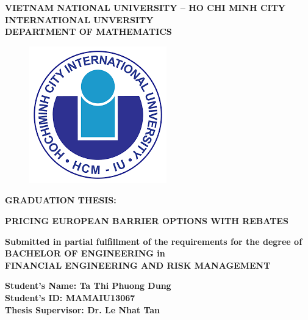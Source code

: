\documentclass[12pt,a4paper,left=2cm,right=2cm,oneside,titlepage]{report}
\numberwithin{equation}{section}
\begin{document}
\thispagestyle{empty}

\begin{center}
	\fontsize{12pt}{18pt}\selectfont \textbf{VIETNAM NATIONAL UNIVERSITY – HO CHI MINH CITY\\
	INTERNATIONAL UNVERSITY\\
	DEPARTMENT OF MATHEMATICS} \vspace{0.8cm}
	
		\begin{figure}[htp]
			\begin{center}
				\includegraphics[scale=.6]{logo}
			\end{center}
		\end{figure}	
	\begin{center}
		\fontsize{12pt}{18pt}\selectfont \textbf{GRADUATION THESIS:} \\ \vspace{36pt}
		
		\fontsize{14pt}{16pt}\selectfont \textbf{PRICING EUROPEAN BARRIER OPTIONS WITH REBATES} \\ \vspace{2pt}
		
		\fontsize{12pt}{18pt}\selectfont \textbf{Submitted in partial fulfillment of the requirements for the degree of \\
		BACHELOR OF ENGINEERING in\\ 
		FINANCIAL ENGINEERING AND RISK MANAGEMENT} \\ \vspace{18pt}
		
			\fontsize{12pt}{18pt}\selectfont \textbf{Student’s Name:	Ta Thi Phuong Dung\\
		Student’s ID:	MAMAIU13067\\
		Thesis Supervisor:	Dr. Le Nhat Tan}
		
	\end{center}
\end{center}
\end{document}

